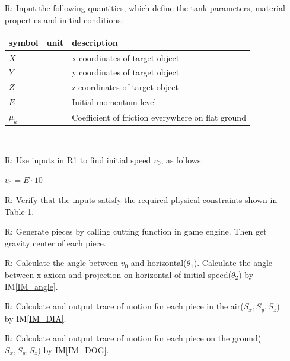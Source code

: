 \documentclass[12pt]{article}
\newcounter{reqnum} %
\begin{document}
	\noindent \begin{itemize}
		
		\item[R\refstepcounter{reqnum}\thereqnum \label{R_Inputs}:] 
		Input the following quantities, which define the tank parameters, material properties
		and initial conditions:
		\noindent \begin{longtable*}{l l l} 
			\toprule
			\textbf{symbol} & \textbf{unit} & \textbf{description}\\
			\midrule 
			$X$ & & x coordinates of target object
			\\
			$Y$ & & y coordinates of target object
			\\
			$Z$ & & z coordinates of target object
			\\
			$E$ & & Initial momentum level
			\\
			$\mu_{k}$ & & Coefficient of friction everywhere on flat ground
			\\
			\bottomrule
		\end{longtable*}
		
		~\newpage
		
		\item[R\refstepcounter{reqnum}\thereqnum \label{R_OutputInputs}:] Use inputs in R1 to find initial speed $v_{0}$, as follows:
		
		$v_{0}=E \cdot 10$
		
		\item[R\refstepcounter{reqnum}\thereqnum \label{R_VerifyOutput}:] Verify that the inputs satisfy the required physical constraints shown in Table 1.
		
		\item[R\refstepcounter{reqnum}\thereqnum \label{R_piece}:] Generate pieces by calling cutting function in game engine. Then get gravity center of each piece.
		
		\item[R\refstepcounter{reqnum}\thereqnum \label{R_Calculate}:]
		Calculate the angle between $v_{0}$ and horizontal($\theta _{1}$). Calculate the angle between x axiom and projection on horizontal of initial speed($\theta _{2}$) by IM\ref{IM_angle}. 
		
		\item[R\refstepcounter{reqnum}\thereqnum \label{R_Output1}:] 
		Calculate and output trace of motion for each piece in the air($S_{x},S_{y},S_{z}$) by IM\ref{IM_DIA}.
		
		\item[R\refstepcounter{reqnum}\thereqnum \label{R_Output2}:] 
		Calculate and output trace of motion for each piece on the ground($S_{x},S_{y},S_{z}$) by IM\ref{IM_DOG}.
		
	\end{itemize}
	
\end{document}
